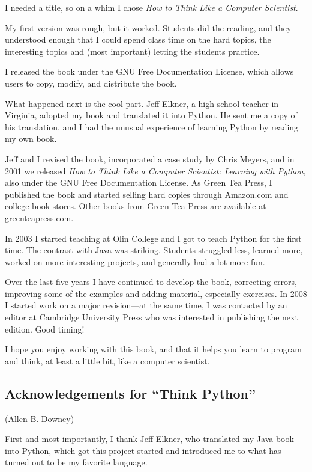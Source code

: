 \documentclass[10pt]{book}
\begin{document}
I needed a title, so on a whim I chose {\em How to Think Like
a Computer Scientist}.

My first version was rough, but it worked.  Students did the reading,
and they understood enough that I could spend class time on the hard
topics, the interesting topics and (most important) letting the
students practice.

I released the book under the GNU Free Documentation License,
which allows users to copy, modify, and distribute the book.


What happened next is the cool part.  Jeff Elkner, a high school
teacher in Virginia, adopted my book and translated it into
Python.  He sent me a copy of his translation, and I had the
unusual experience of learning Python by reading my own book.

Jeff and I revised the book, incorporated a case study by
Chris Meyers, and in 2001 we released {\em How to Think Like
a Computer Scientist: Learning with Python}, also under
the GNU Free Documentation License.
As Green Tea Press, I published the book and started selling
hard copies through Amazon.com and college book stores.
Other books from Green Tea Press are available at
\url{greenteapress.com}.

In 2003 I started teaching at Olin College and I got to teach
Python for the first time.  The contrast with Java was striking.
Students struggled less, learned more, worked on more interesting
projects, and generally had a lot more fun.

Over the last five years I have continued to develop the book,
correcting errors, improving some of the examples and
adding material, especially exercises.  In 2008 I started work
on a major revision---at the same time, I was
contacted by an editor at Cambridge University Press who
was interested in publishing the next edition.  Good timing!

I hope you enjoy working with this book, and that it helps
you learn to program and think, at least a little bit, like
a computer scientist.

\subsection*{Acknowledgements for ``Think Python''}

(Allen B. Downey)

First and most importantly, I thank Jeff Elkner, who
translated my Java book into Python, which got this project
started and introduced me to what has turned out to be my
favorite language.
\end{document}
